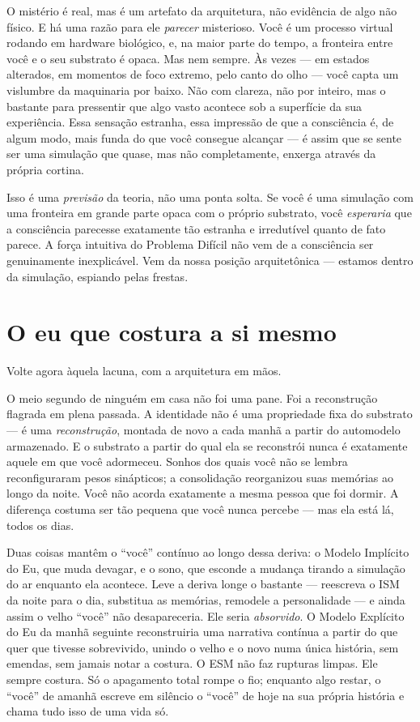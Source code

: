 \documentclass[11pt, twoside, openright]{book}
\begin{document}
O mistério é real, mas é um artefato da arquitetura, não evidência de algo não físico. E há uma razão para ele \textit{parecer} misterioso. Você é um processo virtual rodando em hardware biológico, e, na maior parte do tempo, a fronteira entre você e o seu substrato é opaca. Mas nem sempre. Às vezes --- em estados alterados, em momentos de foco extremo, pelo canto do olho --- você capta um vislumbre da maquinaria por baixo. Não com clareza, não por inteiro, mas o bastante para pressentir que algo vasto acontece sob a superfície da sua experiência. Essa sensação estranha, essa impressão de que a consciência é, de algum modo, mais funda do que você consegue alcançar --- é assim que se sente ser uma simulação que quase, mas não completamente, enxerga através da própria cortina.

Isso é uma \textit{previsão} da teoria, não uma ponta solta. Se você é uma simulação com uma fronteira em grande parte opaca com o próprio substrato, você \textit{esperaria} que a consciência parecesse exatamente tão estranha e irredutível quanto de fato parece. A força intuitiva do Problema Difícil não vem de a consciência ser genuinamente inexplicável. Vem da nossa posição arquitetônica --- estamos dentro da simulação, espiando pelas frestas.

\section*{O eu que costura a si mesmo}

Volte agora àquela lacuna, com a arquitetura em mãos.

O meio segundo de ninguém em casa não foi uma pane. Foi a reconstrução flagrada em plena passada. A identidade não é uma propriedade fixa do substrato --- é uma \textit{reconstrução}, montada de novo a cada manhã a partir do automodelo armazenado. E o substrato a partir do qual ela se reconstrói nunca é exatamente aquele em que você adormeceu. Sonhos dos quais você não se lembra reconfiguraram pesos sinápticos; a consolidação reorganizou suas memórias ao longo da noite. Você não acorda exatamente a mesma pessoa que foi dormir. A diferença costuma ser tão pequena que você nunca percebe --- mas ela está lá, todos os dias.

Duas coisas mantêm o ``você'' contínuo ao longo dessa deriva: o Modelo Implícito do Eu, que muda devagar, e o sono, que esconde a mudança tirando a simulação do ar enquanto ela acontece. Leve a deriva longe o bastante --- reescreva o ISM da noite para o dia, substitua as memórias, remodele a personalidade --- e ainda assim o velho ``você'' não desapareceria. Ele seria \textit{absorvido}. O Modelo Explícito do Eu da manhã seguinte reconstruiria uma narrativa contínua a partir do que quer que tivesse sobrevivido, unindo o velho e o novo numa única história, sem emendas, sem jamais notar a costura. O ESM não faz rupturas limpas. Ele sempre costura. Só o apagamento total rompe o fio; enquanto algo restar, o ``você'' de amanhã escreve em silêncio o ``você'' de hoje na sua própria história e chama tudo isso de uma vida só.
\end{document}
